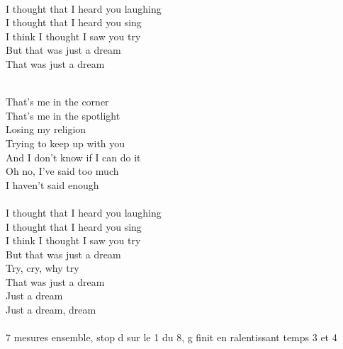 \begin{multicols}{2}
    \columnbreak


    {\\
    I thought that I heard you laughing\\
    I thought that I heard you sing\\
    I think I thought I saw you try\\
    }
    {
        But that was just a dream\\
        That was just a dream\\
    }


    {\\
    That's me in the corner\\
    That's me in the spotlight\\
    Losing my religion\\
    Trying to keep up with you\\
    And I don't know if I can do it\\
    Oh no, I've said too much\\
    I haven't said enough\\
    }
    {\\
    I thought that I heard you laughing\\
    I thought that I heard you sing\\
    I think I thought I saw you try\\
    But that was just a dream\\
    Try, cry, why try\\
    That was just a dream\\
    Just a dream\\
    Just a dream, dream\\
    }
    {\\7 mesures ensemble, stop d sur le 1 du 8, g finit en ralentissant temps 3 et 4}


\end{multicols}